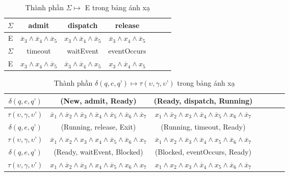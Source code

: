 \documentclass[a4paper,13pt,oneside,openany]{book}
\begin{document}
\begin{flushleft}
	\begin{table}[!ht]
		\centering
		\renewcommand{\arraystretch}{1.25}
		\begin{tabular}{|c|c|c|c|c|c|c|}
			\hline
			$\Sigma$ & admit & dispatch & release\\
			\hline
			E & $\overline{x}_3 \land \overline{x}_4 \land \overline{x}_5$ & $x_3 \land \overline{x}_4 \land \overline{x}_5$ & $\overline{x}_3 \land x_4 \land \overline{x}_5$\\
			\hline
			$\Sigma$ & timeout & waitEvent & eventOccurs\\
			\hline
			E &  $x_3 \land x_4 \land \overline{x}_5$ & $\overline{x}_3 \land \overline{x}_4 \land x_5$ & $x_3 \land \overline{x}_4 \land x_5$\\
			\hline
		\end{tabular}
		\caption{Thành phần $\Sigma \mapsto$ E trong bảng ánh xạ}
	\end{table}
	
	\begin{table}[!ht]
		\centering
		\renewcommand{\arraystretch}{1.25}
		\begin{tabular}{|c|c|c|c|c|c|c|}
			\hline
			$\delta(q, e, q\textrm{'})$ & (New, admit, Ready) & (Ready, dispatch, Running) \\
			\hline
			$\tau(\upsilon, \gamma, \upsilon\textrm{'})$ & $\overline{x}_1 \land \overline{x}_2 \land \overline{x}_3 \land \overline{x}_4 \land \overline{x}_5 \land \overline{x}_6 \land \overline{x}_7$ & $x_1 \land \overline{x}_2 \land x_3 \land \overline{x}_4 \land \overline{x}_5 \land x_6 \land \overline{x}_7$ \\
			\hline
			$\delta(q, e, q\textrm{'})$ & (Running, release, Exit) & (Running, timeout, Ready)\\
			\hline
			$\tau(\upsilon, \gamma, \upsilon\textrm{'})$ & $\overline{x}_1 \land x_2 \land x_3 \land x_4 \land \overline{x}_5 \land \overline{x}_6 \land x_7$ & $\overline{x}_1 \land x_2 \land \overline{x}_3 \land \overline{x}_4 \land x_5 \land \overline{x}_6 \land \overline{x}_7$\\
			\hline
			$\delta(q, e, q\textrm{'})$ & (Ready, waitEvent, Blocked) & (Blocked, eventOccurs, Ready) \\
			\hline
			$\tau(\upsilon, \gamma, \upsilon\textrm{'})$ & $x_1 \land \overline{x}_2 \land \overline{x}_3 \land x_4 \land \overline{x}_5 \land x_6 \land x_7$ & $x_1 \land x_2 \land x_3 \land \overline{x}_4 \land x_5 \land \overline{x}_6 \land \overline{x}_7$\\
			\hline
		\end{tabular}
		\caption{Thành phần $\delta(q, e, q\textrm{'}) \mapsto \tau(\upsilon, \gamma, \upsilon\textrm{'})$ trong bảng ánh xạ}
	\end{table}
	

\end{flushleft}
\end{document}
